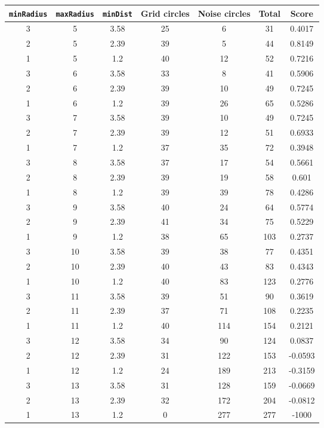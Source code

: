 \documentclass[letterpaper, 12pt]{article}
\begin{document}
\begin{longtable}{|c|c|c|c|c|c|c|}
\hline
\textbf{\texttt{minRadius}} & \textbf{\texttt{maxRadius}} & \textbf{\texttt{minDist}} & \textbf{Grid circles} & \textbf{Noise circles} & \textbf{Total} & \textbf{Score} \\
\hline
3 & 5 & 3.58 & 25 & 6 & 31 & 0.4017 \\
\hline
2 & 5 & 2.39 & 39 & 5 & 44 & 0.8149 \\
\hline
1 & 5 & 1.2 & 40 & 12 & 52 & 0.7216 \\
\hline
3 & 6 & 3.58 & 33 & 8 & 41 & 0.5906 \\
\hline
2 & 6 & 2.39 & 39 & 10 & 49 & 0.7245 \\
\hline
1 & 6 & 1.2 & 39 & 26 & 65 & 0.5286 \\
\hline
3 & 7 & 3.58 & 39 & 10 & 49 & 0.7245 \\
\hline
2 & 7 & 2.39 & 39 & 12 & 51 & 0.6933 \\
\hline
1 & 7 & 1.2 & 37 & 35 & 72 & 0.3948 \\
\hline
3 & 8 & 3.58 & 37 & 17 & 54 & 0.5661 \\
\hline
2 & 8 & 2.39 & 39 & 19 & 58 & 0.601 \\
\hline
1 & 8 & 1.2 & 39 & 39 & 78 & 0.4286 \\
\hline
3 & 9 & 3.58 & 40 & 24 & 64 & 0.5774 \\
\hline
2 & 9 & 2.39 & 41 & 34 & 75 & 0.5229 \\
\hline
1 & 9 & 1.2 & 38 & 65 & 103 & 0.2737 \\
\hline
3 & 10 & 3.58 & 39 & 38 & 77 & 0.4351 \\
\hline
2 & 10 & 2.39 & 40 & 43 & 83 & 0.4343 \\
\hline
1 & 10 & 1.2 & 40 & 83 & 123 & 0.2776 \\
\hline
3 & 11 & 3.58 & 39 & 51 & 90 & 0.3619 \\
\hline
2 & 11 & 2.39 & 37 & 71 & 108 & 0.2235 \\
\hline
1 & 11 & 1.2 & 40 & 114 & 154 & 0.2121 \\
\hline
3 & 12 & 3.58 & 34 & 90 & 124 & 0.0837 \\
\hline
2 & 12 & 2.39 & 31 & 122 & 153 & -0.0593 \\
\hline
1 & 12 & 1.2 & 24 & 189 & 213 & -0.3159 \\
\hline
3 & 13 & 3.58 & 31 & 128 & 159 & -0.0669 \\
\hline
2 & 13 & 2.39 & 32 & 172 & 204 & -0.0812 \\
\hline
1 & 13 & 1.2 & 0 & 277 & 277 & -1000 \\

\end{longtable}
\end{document}
